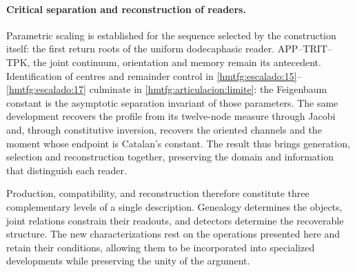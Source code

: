 \paragraph{Critical separation and reconstruction of readers.}
Parametric scaling is established for the sequence selected by the construction itself: the first return roots of the uniform dodecaphasic reader. APP--TRIT--TPK, the joint continuum, orientation and memory remain its antecedent. Identification of centres and remainder control in \ref{hmtfg:escalado:15}--\ref{hmtfg:escalado:17} culminate in \eqref{hmtfg:articulacion:limite}: the Feigenbaum constant is the asymptotic separation invariant of those parameters. The same development recovers the profile from its twelve-node measure through Jacobi and, through constitutive inversion, recovers the oriented channels and the moment whose endpoint is Catalan's constant. The result thus brings generation, selection and reconstruction together, preserving the domain and information that distinguish each reader.




Production, compatibility, and reconstruction therefore constitute three
complementary levels of a single description. Genealogy determines the
objects, joint relations constrain their readouts, and detectors
determine the recoverable structure. The new characterizations rest on
the operations presented here and retain their conditions, allowing
them to be incorporated into specialized developments while preserving
the unity of the argument.
